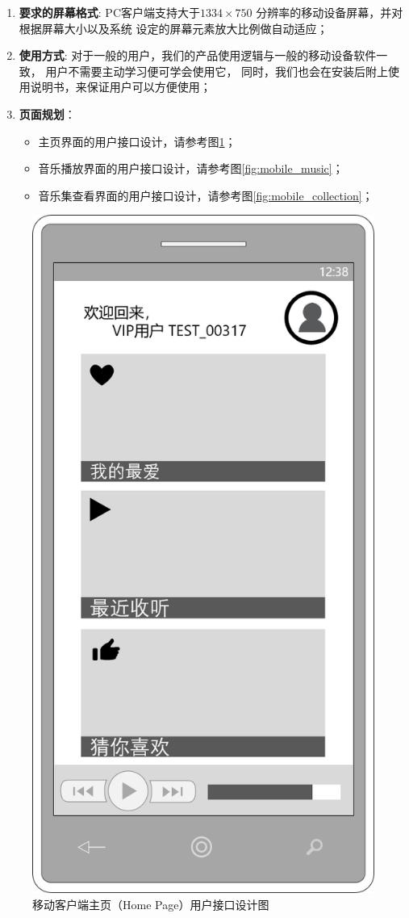 \begin{enumerate}
	\item \textbf{要求的屏幕格式}:
		PC客户端支持大于$1334 \times 750$ 分辨率的移动设备屏幕，并对根据屏幕大小以及系统
		设定的屏幕元素放大比例做自动适应；
	\item \textbf{使用方式}:
		对于一般的用户，我们的产品使用逻辑与一般的移动设备软件一致，
			用户不需要主动学习便可学会使用它，
		同时，我们也会在安装后附上使用说明书，来保证用户可以方便使用；
	\item \textbf{页面规划}： 
	\begin{itemize}
		\item 主页界面的用户接口设计，请参考图\ref{fig:mobile_home}；
		\item 音乐播放界面的用户接口设计，请参考图\ref{fig:mobile_music}；
		\item 音乐集查看界面的用户接口设计，请参考图\ref{fig:mobile_collection}；
	\end{itemize}
\end{enumerate}

\begin{figure}[h!]
  \centering

  \includegraphics[width=.33\linewidth]{figures/mobile_home}

  \caption{  \label{fig:mobile_home}
  		移动客户端主页（Home Page）用户接口设计图
    }
\end{figure}


